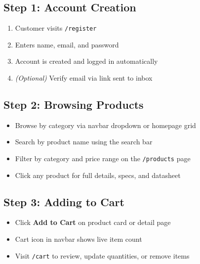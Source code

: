\documentclass[12pt,a4paper]{article}
\begin{document}
\subsection{Step 1: Account Creation}
\begin{enumerate}[leftmargin=2em, itemsep=3pt]
  \item Customer visits \texttt{/register}
  \item Enters name, email, and password
  \item Account is created and logged in automatically
  \item \textit{(Optional)} Verify email via link sent to inbox
\end{enumerate}

\subsection{Step 2: Browsing Products}
\begin{itemize}[leftmargin=1.5em, itemsep=3pt]
  \item Browse by category via navbar dropdown or homepage grid
  \item Search by product name using the search bar
  \item Filter by category and price range on the \texttt{/products} page
  \item Click any product for full details, specs, and datasheet
\end{itemize}

\subsection{Step 3: Adding to Cart}
\begin{itemize}[leftmargin=1.5em, itemsep=3pt]
  \item Click \textbf{Add to Cart} on product card or detail page
  \item Cart icon in navbar shows live item count
  \item Visit \texttt{/cart} to review, update quantities, or remove items
\end{itemize}
\end{document}
